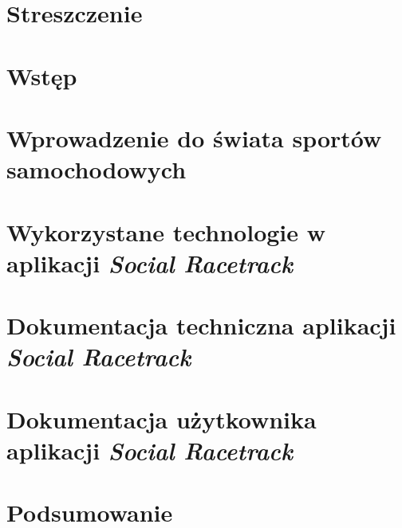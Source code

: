 \documentclass[a4paper,12pt,polish,twoside]{extreport}
\begin{document}
 {

    

    \null\newpage

    \tableofcontents

    \chapter*{Streszczenie}
    \label{chapter0:streszczenie} {
        
    }

    \chapter{Wstęp}
    \label{chapter1:wstep} {
        
    }

    \chapter{Wprowadzenie do świata sportów samochodowych}
    \label{chapter2:wprowadzenie_sporty} {
        
    }

    \chapter{Wykorzystane technologie w aplikacji \textit{Social Racetrack}}
    \label{chapter3:technologie} {
        
    }

    \chapter{Dokumentacja techniczna aplikacji \textit{Social Racetrack}}
    \label{chapter4:dok_techniczna} {
        
    }

    \chapter{Dokumentacja użytkownika aplikacji \textit{Social Racetrack}}
    \label{chapter5:dok_uzytkownika} {
        
    }

    \chapter{Podsumowanie}
    \label{chapter6:podsumowanie} {
        
    }

    \newpage
    \listoffigures

    \newpage
    \listofcodes

    \newpage
    \renewcommand{\listtablename}{Spis tabel}
    \listoftables

    \newpage
    \printbibliography[heading=bibintoc,title={Bibliografia}]
}
\end{document}
